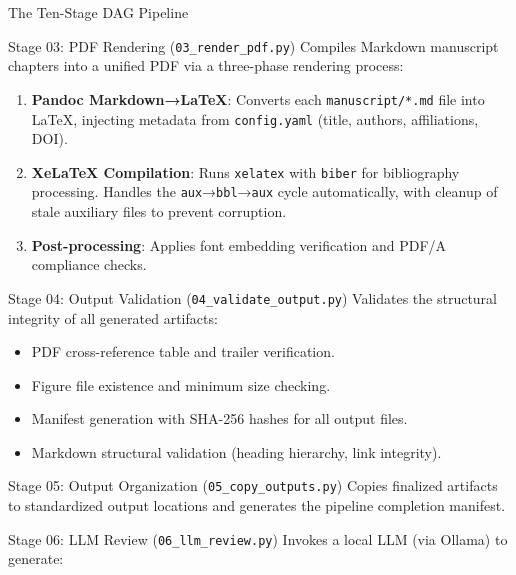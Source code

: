 \documentclass[
  ignorenonframetext,
]{beamer}
\providecommand{\tightlist}{%
  \setlength{\itemsep}{0pt}\setlength{\parskip}{0pt}}
\begin{document}
\begin{frame}[fragile]{The Ten-Stage DAG Pipeline}
\begin{block}{Stage 03: PDF Rendering (\texttt{03\_render\_pdf.py})}
\protect{}\label{stage-03-pdf-rendering-03_render_pdf.py}
Compiles Markdown manuscript chapters into a unified PDF via a
three-phase rendering process:

\begin{enumerate}
\tightlist
\item
  \textbf{Pandoc Markdown→LaTeX}: Converts each \texttt{manuscript/*.md}
  file into LaTeX, injecting metadata from \texttt{config.yaml} (title,
  authors, affiliations, DOI).
\item
  \textbf{XeLaTeX Compilation}: Runs \texttt{xelatex} with
  \texttt{biber} for bibliography processing. Handles the
  \texttt{aux}→\texttt{bbl}→\texttt{aux} cycle automatically, with
  cleanup of stale auxiliary files to prevent corruption.
\item
  \textbf{Post-processing}: Applies font embedding verification and
  PDF/A compliance checks.
\end{enumerate}
\end{block}

\begin{block}{Stage 04: Output Validation
(\texttt{04\_validate\_output.py})}
\protect{}\label{stage-04-output-validation-04_validate_output.py}
Validates the structural integrity of all generated artifacts:

\begin{itemize}
\tightlist
\item
  PDF cross-reference table and trailer verification.
\item
  Figure file existence and minimum size checking.
\item
  Manifest generation with SHA-256 hashes for all output files.
\item
  Markdown structural validation (heading hierarchy, link integrity).
\end{itemize}
\end{block}

\begin{block}{Stage 05: Output Organization
(\texttt{05\_copy\_outputs.py})}
\protect{}\label{stage-05-output-organization-05_copy_outputs.py}
Copies finalized artifacts to standardized output locations and
generates the pipeline completion manifest.
\end{block}

\begin{block}{Stage 06: LLM Review (\texttt{06\_llm\_review.py})}
\protect{}\label{stage-06-llm-review-06_llm_review.py}
Invokes a local LLM (via Ollama) to generate:


\end{block}
\end{frame}
\end{document}

